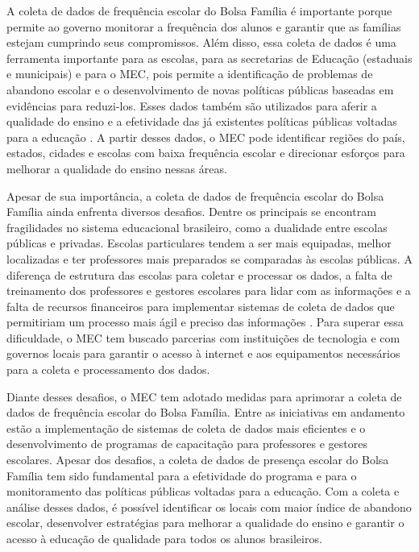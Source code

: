 A coleta de dados de frequência escolar do Bolsa Família é importante porque permite ao governo monitorar a frequência dos alunos e garantir que as famílias estejam cumprindo seus compromissos. Além disso, essa coleta de dados é uma ferramenta importante para as escolas, para as secretarias de Educação (estaduais e municipais)  e para o MEC, pois permite a identificação de problemas de abandono escolar e o desenvolvimento de novas políticas públicas baseadas em evidências para reduzi-los. Esses dados também são utilizados para aferir a qualidade do ensino e a efetividade das já existentes políticas públicas voltadas para a educação \cite{santos:2019, Monteiro:2009}. A partir desses dados, o MEC pode identificar regiões do país, estados, cidades e escolas com baixa frequência escolar e direcionar esforços para melhorar a qualidade do ensino nessas áreas.

Apesar de sua importância, a coleta de dados de frequência escolar do Bolsa Família ainda enfrenta diversos desafios. Dentre os principais se encontram fragilidades no sistema educacional brasileiro, como a dualidade entre escolas públicas e privadas. Escolas particulares tendem a ser mais equipadas, %
melhor localizadas e ter professores mais preparados se comparadas às escolas públicas. A diferença de estrutura das escolas para coletar e processar os dados, a falta de treinamento dos professores e gestores escolares para lidar com as informações e a falta de recursos financeiros para implementar sistemas de coleta de dados que permitiriam um processo mais ágil e preciso das informações \cite{DutraThom2016}. Para superar essa dificuldade, o MEC tem buscado parcerias com instituições de tecnologia e com governos locais para garantir o acesso à internet e aos equipamentos necessários para a coleta e processamento dos dados. %

Diante desses desafios, o MEC tem adotado medidas para aprimorar a coleta de dados de frequência escolar do Bolsa Família. Entre as iniciativas em andamento estão a implementação de sistemas de coleta de dados mais eficientes e o desenvolvimento de programas de capacitação para professores e gestores escolares. Apesar dos desafios, a coleta de dados de presença escolar do Bolsa Família tem sido fundamental para a efetividade do programa e para o monitoramento das políticas públicas voltadas para a educação. Com a coleta e análise desses dados, é possível identificar os locais com maior índice de abandono escolar, desenvolver estratégias para melhorar a qualidade do ensino e garantir o acesso à educação de qualidade para todos os alunos brasileiros.

